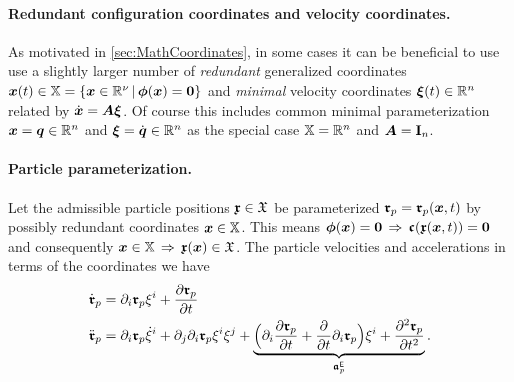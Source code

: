 \paragraph{Redundant configuration coordinates and velocity coordinates.} 
As motivated in \autoref{sec:MathCoordinates}, in some cases it can be beneficial to use use a slightly larger number of \textit{redundant} generalized coordinates $\sysCoord(t) \in \configSpace = \{ \sysCoord \in \RealNum^{\numCoord} \, | \, \geoConstraint(\sysCoord) = \tuple{0} \}$ and \textit{minimal} velocity coordinates $\sysVel(t) \in \RealNum^{\dimConfigSpace}$ related by $\sysCoordd = \kinMat \sysVel$.
Of course this includes common minimal parameterization $\sysCoord = \genCoord \in \RealNum^{\dimConfigSpace}$ and $\sysVel=\genCoordd \in \RealNum^{\dimConfigSpace}$ as the special case $\configSpace=\RealNum^{\dimConfigSpace}$ and $\kinMat=\idMat[\dimConfigSpace]$.

\paragraph{Particle parameterization.}
Let the admissible particle positions $\particleCoord \in \particleConfigSpace$ be parameterized $\particlePos{\PidxI} = \particlePos{\PidxI}(\sysCoord, t)$ by possibly redundant coordinates $\sysCoord \in \configSpace$.
This means $\geoConstraint(\sysCoord) = \tuple{0}\,\Rightarrow\,\particleGeoConstraint(\particleCoord(\sysCoord,t)) = \tuple{0}$ and consequently $\sysCoord \in \configSpace \, \Rightarrow \, \particleCoord(\sysCoord) \in \particleConfigSpace$.
The particle velocities and accelerations in terms of the coordinates we have 
\begin{subequations}\label{eq:particleVelAcc}
\begin{align}
 \particlePosd{\PidxI} &= \dirDiff{\LidxI}\particlePos{\PidxI} \sysVelCoeff{\LidxI} + \pdiff[\particlePos{\PidxI}]{t}
\\
 \particlePosdd{\PidxI} &= \dirDiff{\LidxI}\particlePos{\PidxI} \sysVelCoeffd{\LidxI} + \dirDiff{\LidxII}\dirDiff{\LidxI}\particlePos{\PidxI} \sysVelCoeff{\LidxI} \sysVelCoeff{\LidxII}
  + \underbrace{\Big( \dirDiff{\LidxI} \pdiff[\particlePos{\PidxI}]{t} + \pdiff{t}\dirDiff{i}\particlePos{\PidxI} \Big) \sysVelCoeff{\LidxI} + \frac{\partial^2 \particlePos{\PidxI}}{\partial t^2}}_{\particleAccTime{\PidxI}}.
\label{eq:particleAcc}
\end{align}
\end{subequations}

